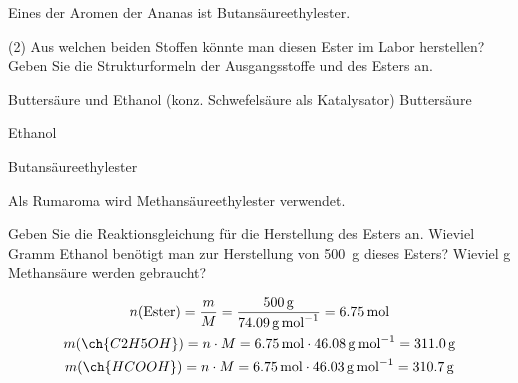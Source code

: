 \documentclass[DIV11]{scrartcl}
\begin{document}
\begin{question}[name=Ester I]
Eines der Aromen der Ananas ist Butansäureethylester.
\begin{tasks}(2)
  \task Aus welchen beiden Stoffen könnte man diesen Ester im Labor
    herstellen?
  \task Geben Sie die Strukturformeln der Ausgangsstoffe und des Esters an.
\end{tasks}
\end{question}
\begin{solution}[name=Ester I]
\begin{tasks}
  \task Buttersäure und Ethanol (konz. Schwefelsäure als Katalysator)
  \task Buttersäure \par
    Ethanol \par
    Butansäureethylester 
\end{tasks}
\end{solution}

\begin{question}[name=Ester II]
Als Rumaroma wird Methansäureethylester verwendet.
\begin{tasks}
  \task Geben Sie die Reaktionsgleichung für die Herstellung des Esters an.
  \task Wieviel Gramm Ethanol benötigt man zur Herstellung von \SI{500}{\gram}
    dieses Esters? Wieviel \si{\gram} Methansäure werden gebraucht?
\end{tasks}
\end{question}
\begin{solution}[name=Ester II]
\begin{tasks}
  \task {}
  \task
    \begin{gather*}
      n(\text{Ester})
        = \frac{m}{M}
        = \frac{\SI{500}{\gram}}{\SI{74.09}{\gram\per\mole}}
        = \SI{6.75}{\mole} \\
      m(\ch{C2H5OH})
        = n \cdot M
        = \SI{6.75}{\mole}\cdot\SI{46.08}{\gram\per\mole}
        = \SI{311.0}{\gram} \\
      m(\ch{HCOOH})
        = n \cdot M
        = \SI{6.75}{\mole}\cdot\SI{46.03}{\gram\per\mole}
        = \SI{310.7}{\gram}
    \end{gather*}
\end{tasks}
\end{solution}
\end{document}
